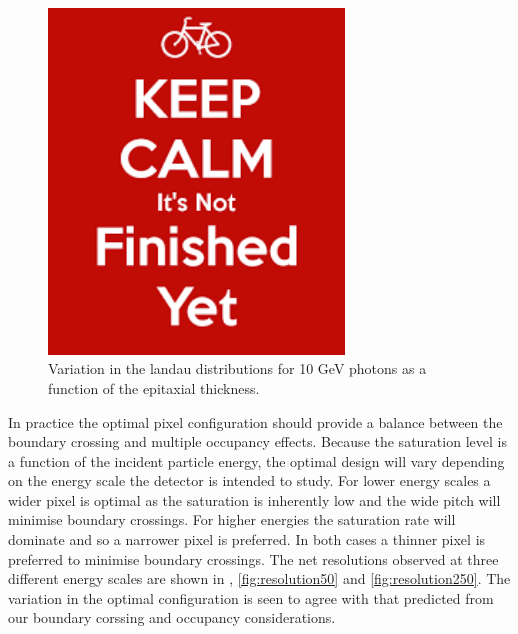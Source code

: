 \begin{figure}
  \centering
  \includegraphics[width=0.7\textwidth,keepaspectratio]{DECALStudies/fig/dummy}
  \caption{Variation in the landau distributions for 10 GeV photons as a function of the epitaxial thickness.}
  \label{fig:landauthickness}
\end{figure}

In practice the optimal pixel configuration should provide a balance between the boundary crossing and multiple occupancy effects. Because the saturation level is a function of the incident particle energy, the optimal design will vary depending on the energy scale the detector is intended to study. For lower energy scales a wider pixel is optimal as the saturation is inherently low and the wide pitch will minimise boundary crossings. For higher energies the saturation rate will dominate and so a narrower pixel is preferred. In both cases a thinner pixel is preferred to minimise boundary crossings. The net resolutions observed at three different energy scales are shown in , \ref{fig:resolution50} and \ref{fig:resolution250}. The variation in the optimal configuration is seen to agree with that predicted from our boundary corssing and occupancy considerations.

